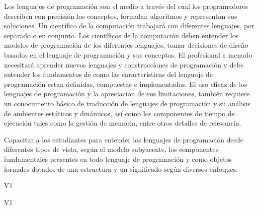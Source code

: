 \begin{syllabus}


\begin{justification}
Los lenguajes de programación son el medio a través del cual los programadores describen con precisión los conceptos, 
formulan algoritmos y representan sus soluciones. Un científico de la computación trabajará con diferentes lenguajes, 
por separado o en conjunto. Los científicos de la computación deben entender los modelos de programación de los diferentes 
lenguajes, tomar decisiones de diseño basados en el lenguaje de programación y sus conceptos. El profesional a menudo 
necesitará aprender nuevos lenguajes y construcciones de programación y debe entender los fundamentos de como las 
características del lenguaje de programación estan definidas, compuestas e implementadas. El uso eficaz de los lenguajes 
de programación y la apreciación de sus limitaciones, también requiere un conocimiento básico de traducción de lenguajes 
de programación y su análisis de ambientes estáticos y dinámicos, así como los componentes de tiempo de ejecución tales 
como la gestión de memoria, entre otros detalles de relevancia.
\end{justification}

\begin{goals}
\item Capacitar a los estudiantes para entender los lenguajes de programación desde diferentes tipos de vista, según el 
modelo subyacente, los componentes fundamentales presentes en todo lenguaje de programación y como objetos formales 
dotados de una estructura y un significado según diversos enfoques.
\end{goals}

\begin{outcomes}{V1}
    \item {}
    \item {}
    \item {} 
    \item {} 		
\end{outcomes}

\begin{competences}{V1}
    \item {} 
    \item {}
    \item {}
    \item {}
    \item {}
\end{competences}


\end{syllabus}
